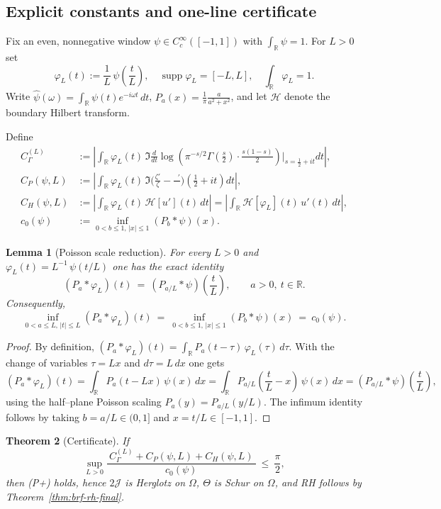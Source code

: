 \documentclass[11pt]{article}
\newtheorem{theorem}{Theorem}
\newtheorem{lemma}[theorem]{Lemma}
\theoremstyle{definition}
\theoremstyle{remark}
\newcommand{\R}{\mathbb{R}}
\newcommand{\Poisson}{P}
\DeclareMathOperator{\dettwo}{det_2}
\begin{document}
\subsection{Explicit constants and one-line certificate}\label{sec:certificate}
Fix an even, nonnegative window $\psi\in C_c^\infty([-1,1])$ with $\int_\R\psi=1$. For $L>0$ set
\[ \varphi_L(t):=\frac{1}{L}\,\psi\!\left(\frac{t}{L}\right),\quad \operatorname{supp}\varphi_L=[-L,L],\quad \int_\R \varphi_L=1. \]
Write $\widehat\psi(\omega)=\int_\R \psi(t)e^{-i\omega t}\,dt$, $\Poisson_a(x)=\tfrac{1}{\pi}\tfrac{a}{a^2+x^2}$, and let $\mathcal H$ denote the boundary Hilbert transform.

Define
\begin{align*}
 C_\Gamma^{(L)} &:= \left|\int_\R \varphi_L(t)\,\Im\frac{d}{dt}\log\!\left(\pi^{-s/2}\Gamma\!\left(\frac{s}{2}\right)\cdot\frac{s(1-s)}{2}\right)\!\Big|_{s=\frac12+it} dt\right|,\\
 C_P(\psi,L) &:= \left|\int_\R \varphi_L(t)\,\Im\Big(\frac{\zeta'}{\zeta}-\frac{\dettwo'}{\dettwo}\Big)\!\left(\tfrac12+it\right) dt\right|,\\
 C_H(\psi,L) &:= \left|\int_\R \varphi_L(t)\,\mathcal H[u'](t)\,dt\right|=\left|\int_\R \mathcal H[\varphi_L](t)\,u'(t)\,dt\right|,\\
 c_0(\psi) &:= \inf_{0<b\le 1,\,|x|\le 1} (\Poisson_b*\psi)(x).
\end{align*}
\begin{lemma}[Poisson scale reduction]\label{lem:poisson-scale}
For every $L>0$ and $\varphi_L(t)=L^{-1}\,\psi(t/L)$ one has the exact identity
\[
  (\Poisson_a*\varphi_L)(t)\ =\ (\Poisson_{a/L}*\psi)\!\left(\frac{t}{L}\right),\qquad a>0,\ t\in\R.
\]
Consequently,
\[
  \inf_{0<a\le L,\,|t|\le L}(\Poisson_a*\varphi_L)(t)\ =\ \inf_{0<b\le 1,\,|x|\le 1}(\Poisson_b*\psi)(x)\ =\ c_0(\psi).
\]
\end{lemma}
\begin{proof}
By definition, $(\Poisson_a*\varphi_L)(t)=\int_\R \Poisson_a(t-\tau)\,\varphi_L(\tau)\,d\tau$. With the change of variables $\tau=Lx$ and $d\tau=L\,dx$ one gets
\[
  (\Poisson_a*\varphi_L)(t)
  =\int_\R \Poisson_a(t-Lx)\,\psi(x)\,dx
  =\int_\R \Poisson_{a/L}\!\left(\frac{t}{L}-x\right)\,\psi(x)\,dx
  =(\Poisson_{a/L}*\psi)\!\left(\frac{t}{L}\right),
\]
using the half–plane Poisson scaling $\Poisson_a(y)=\Poisson_{a/L}(y/L)$. The infimum identity follows by taking $b=a/L\in(0,1]$ and $x=t/L\in[-1,1]$.
\end{proof}

\begin{theorem}[Certificate]\label{thm:certificate}
If
\[ \sup_{L>0} \frac{\ C_\Gamma^{(L)} + C_P(\psi,L) + C_H(\psi,L)\ }{\ c_0(\psi)\ }\ \le\ \frac{\pi}{2}, \]
then \emph{(P+)} holds, hence $2\mathcal J$ is Herglotz on $\Omega$, $\Theta$ is Schur on $\Omega$, and RH follows by Theorem~\ref{thm:brf-rh-final}.
\end{theorem}
\end{document}

